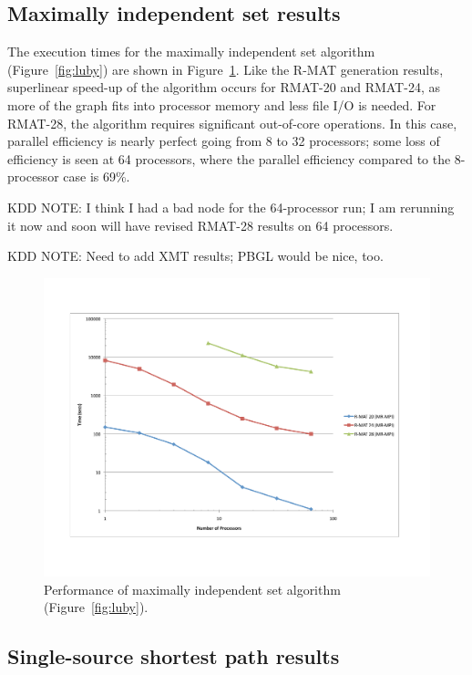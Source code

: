 \subsection{Maximally independent set results}

The execution times for the maximally independent set algorithm
(Figure~\ref{fig:luby}) are shown in Figure~\ref{f:luby}.  Like the R-MAT
generation results, superlinear speed-up of the algorithm occurs for RMAT-20
and RMAT-24, as more of the graph fits into processor memory and less file
I/O is needed.  For RMAT-28, the algorithm requires significant out-of-core
operations. In this case, parallel efficiency is nearly perfect going from 
8 to 32 processors; some loss of efficiency is seen at 64 processors,
where the parallel efficiency compared to the 8-processor case is 69\%.

KDD NOTE:  I think I had a bad node for the 64-processor run; I am 
rerunning it now and soon will have revised RMAT-28 results on 64 processors.

KDD NOTE:  Need to add XMT results; PBGL would be nice, too.

\begin{figure}[htb]
\includegraphics[width=\textwidth]{fig_luby.pdf}
\caption{Performance of maximally independent set algorithm (Figure~\ref{fig:luby}).}
\label{f:luby}
\end{figure}

\subsection{Single-source shortest path results}

